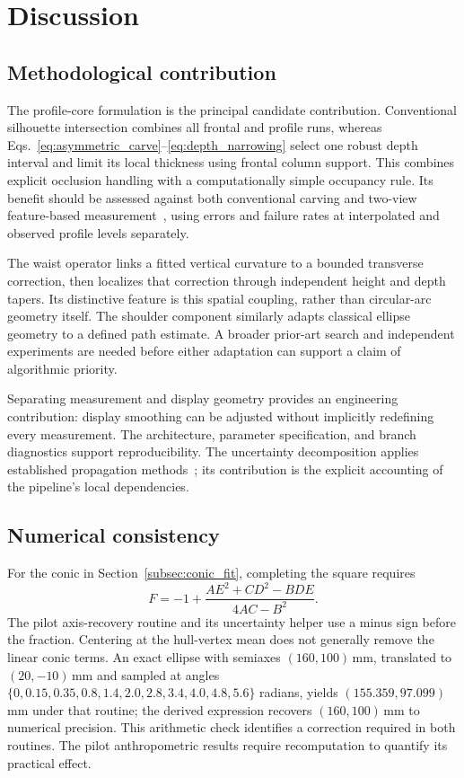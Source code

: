 \documentclass[11pt,a4paper]{article}
\numberwithin{equation}{section}
\begin{document}
\section{Discussion}
\label{sec:discussion}
\subsection{Methodological contribution}
The profile-core formulation is the principal candidate contribution. Conventional silhouette intersection combines all frontal and profile runs, whereas Eqs.~\eqref{eq:asymmetric_carve}--\eqref{eq:depth_narrowing} select one robust depth interval and limit its local thickness using frontal column support. This combines explicit occlusion handling with a computationally simple occupancy rule. Its benefit should be assessed against both conventional carving and two-view feature-based measurement~\cite{aslam2017}, using errors and failure rates at interpolated and observed profile levels separately.

The waist operator links a fitted vertical curvature to a bounded transverse correction, then localizes that correction through independent height and depth tapers. Its distinctive feature is this spatial coupling, rather than circular-arc geometry itself. The shoulder component similarly adapts classical ellipse geometry to a defined path estimate. A broader prior-art search and independent experiments are needed before either adaptation can support a claim of algorithmic priority.

Separating measurement and display geometry provides an engineering contribution: display smoothing can be adjusted without implicitly redefining every measurement. The architecture, parameter specification, and branch diagnostics support reproducibility. The uncertainty decomposition applies established propagation methods~\cite{jcgm2008}; its contribution is the explicit accounting of the pipeline's local dependencies.

\subsection{Numerical consistency}
\label{subsec:conic_audit}
For the conic in Section~\ref{subsec:conic_fit}, completing the square requires
\begin{equation}
F=-1+\frac{AE^2+CD^2-BDE}{4AC-B^2}.
\end{equation}
The pilot axis-recovery routine and its uncertainty helper use a minus sign before the fraction. Centering at the hull-vertex mean does not generally remove the linear conic terms. An exact ellipse with semiaxes $(160,100)$\,mm, translated to $(20,-10)$\,mm and sampled at angles $\{0,0.15,0.35,0.8,1.4,2.0,2.8,3.4,4.0,4.8,5.6\}$ radians, yields $(155.359,97.099)$\,mm under that routine; the derived expression recovers $(160,100)$\,mm to numerical precision. This arithmetic check identifies a correction required in both routines. The pilot anthropometric results require recomputation to quantify its practical effect.
\end{document}
